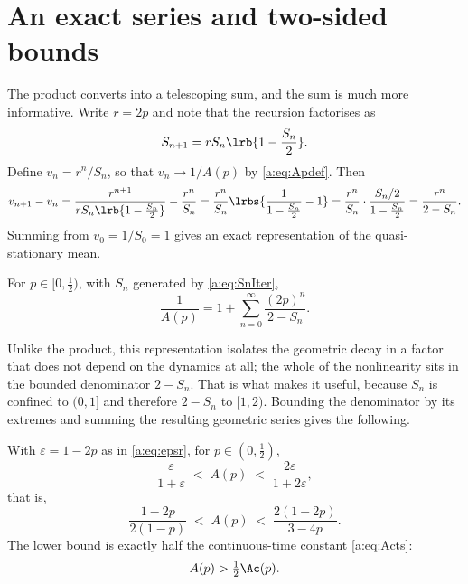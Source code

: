 \section{An exact series and two-sided bounds}
\label{a:sec:series}

The product converts into a telescoping sum, and the sum is much more informative.
Write $r=2p$ and note that the recursion factorises as
\begin{equation*}
S_{n+1} = rS_n\lrb{1-\frac{S_n}{2}} .
\end{equation*}
Define $v_n = r^n/S_n$, so that $v_n\to1/A(p)$ by \cref{a:eq:Apdef}. Then
\begin{equation}
\label{a:eq:vincrement}
v_{n+1}-v_n
= \frac{r^{n+1}}{rS_n\lrb{1-\frac{S_n}{2}}} - \frac{r^n}{S_n}
= \frac{r^n}{S_n}\lrbs{\frac{1}{1-\frac{S_n}{2}}-1}
= \frac{r^n}{S_n}\cdot\frac{S_n/2}{1-\frac{S_n}{2}}
= \frac{r^n}{2-S_n} .
\end{equation}
Summing from $v_0 = 1/S_0 = 1$ gives an exact representation of the
quasi-stationary mean.

\begin{proposition}
\label{a:prop:series}
For $p\in[0,\tfrac12)$, with $S_n$ generated by \cref{a:eq:SnIter},
\begin{equation}
\label{a:eq:Aseries}
\frac{1}{A(p)} = 1 + \sum_{n=0}^{\infty}\frac{(2p)^n}{2-S_n} .
\end{equation}
\end{proposition}

\noindent
Unlike the product, this representation isolates the geometric decay in a factor
that does not depend on the dynamics at all; the whole of the nonlinearity sits in
the bounded denominator $2-S_n$. That is what makes it useful, because $S_n$ is
confined to $(0,1]$ and therefore $2-S_n$ to $[1,2)$. Bounding the denominator by
its extremes and summing the resulting geometric series gives the following.

\begin{proposition}
\label{a:prop:bounds}
With $\varepsilon=1-2p$ as in \cref{a:eq:epsr}, for $p\in(0,\tfrac12)$,
\begin{equation}
\label{a:eq:Abounds}
\frac{\varepsilon}{1+\varepsilon} \;<\; A(p) \;<\; \frac{2\varepsilon}{1+2\varepsilon},
\end{equation}
that is,
\begin{equation}
\label{a:eq:Aboundsexplicit}
\frac{1-2p}{2(1-p)} \;<\; A(p) \;<\; \frac{2(1-2p)}{3-4p}.
\end{equation}
The lower bound is exactly half the continuous-time constant \cref{a:eq:Acts}:
\begin{equation}
\label{a:eq:halfAc}
A(p) > \tfrac12\Ac(p) .
\end{equation}
\end{proposition}


